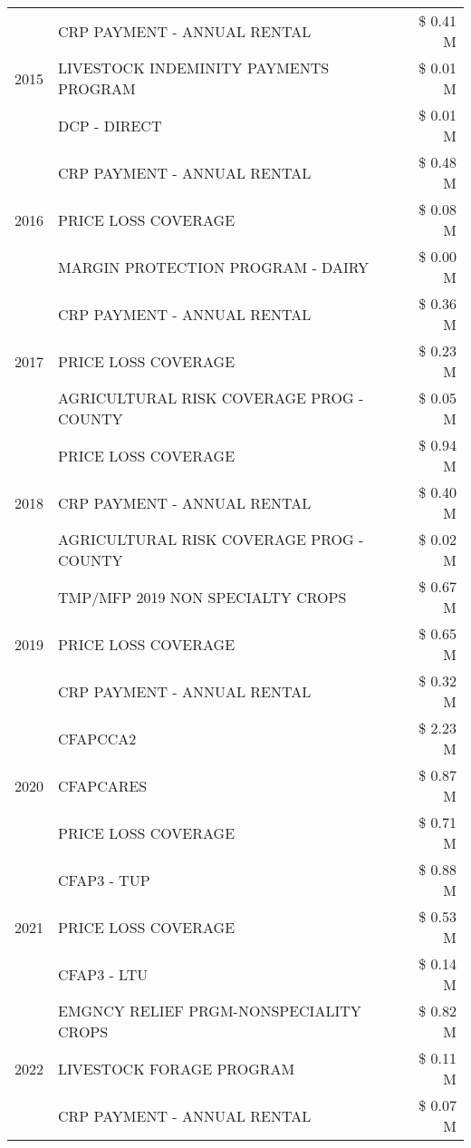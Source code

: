 \begin{tabular}{llr}
\cline{1-3}
\multirow[t]{3}{*}{2015} & CRP PAYMENT - ANNUAL RENTAL & \$ 0.41 M \\
 & LIVESTOCK INDEMINITY PAYMENTS PROGRAM & \$ 0.01 M \\
 & DCP - DIRECT & \$ 0.01 M \\
\cline{1-3}
\multirow[t]{3}{*}{2016} & CRP PAYMENT - ANNUAL RENTAL & \$ 0.48 M \\
 & PRICE LOSS COVERAGE & \$ 0.08 M \\
 & MARGIN PROTECTION PROGRAM - DAIRY & \$ 0.00 M \\
\cline{1-3}
\multirow[t]{3}{*}{2017} & CRP PAYMENT - ANNUAL RENTAL & \$ 0.36 M \\
 & PRICE LOSS COVERAGE & \$ 0.23 M \\
 & AGRICULTURAL RISK COVERAGE PROG - COUNTY & \$ 0.05 M \\
\cline{1-3}
\multirow[t]{3}{*}{2018} & PRICE LOSS COVERAGE & \$ 0.94 M \\
 & CRP PAYMENT - ANNUAL RENTAL & \$ 0.40 M \\
 & AGRICULTURAL RISK COVERAGE PROG - COUNTY & \$ 0.02 M \\
\cline{1-3}
\multirow[t]{3}{*}{2019} & TMP/MFP 2019 NON SPECIALTY CROPS & \$ 0.67 M \\
 & PRICE LOSS COVERAGE & \$ 0.65 M \\
 & CRP PAYMENT - ANNUAL RENTAL & \$ 0.32 M \\
\cline{1-3}
\multirow[t]{3}{*}{2020} & CFAPCCA2 & \$ 2.23 M \\
 & CFAPCARES & \$ 0.87 M \\
 & PRICE LOSS COVERAGE & \$ 0.71 M \\
\cline{1-3}
\multirow[t]{3}{*}{2021} & CFAP3 - TUP & \$ 0.88 M \\
 & PRICE LOSS COVERAGE & \$ 0.53 M \\
 & CFAP3 - LTU & \$ 0.14 M \\
\cline{1-3}
\multirow[t]{3}{*}{2022} & EMGNCY RELIEF PRGM-NONSPECIALITY CROPS & \$ 0.82 M \\
 & LIVESTOCK FORAGE PROGRAM & \$ 0.11 M \\
 & CRP PAYMENT - ANNUAL RENTAL & \$ 0.07 M \\
\cline{1-3}
\bottomrule
\end{tabular}
